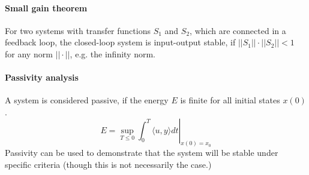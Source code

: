 \paragraph{Small gain theorem}
For two systems with transfer functions $S_1$ and $S_2$, which are connected in a feedback
loop, the closed-loop system is input-output stable, if $||S_1|| \cdot ||S_2|| < 1$
for any norm $||\cdot||$, e.g. the infinity norm.

\paragraph{Passivity analysis}
A system is considered passive, if the energy $E$ is finite for all initial states $x(0)$.
\[
    E = \left. \sup_{T\leq 0}\int_0^T \langle u,y \rangle dt \right|_{x(0) = x_0}
\]
Passivity can be used to demonstrate that the system will be stable under specific criteria
(though this is not necessarily the case.)

